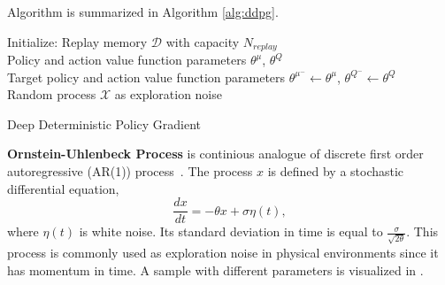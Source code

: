 Algorithm is summarized in Algorithm \ref{alg:ddpg}. 
\begin{algorithm}
	\SetAlgoLined
	\DontPrintSemicolon %
	Initialize: Replay memory $\mathcal{D}$ with capacity $N_{replay}$ \\
	Policy and action value function parameters $\theta^{\mu}$, $\theta^Q$ \\
	Target policy and action value function parameters $\theta^{\mu^-} \leftarrow \theta^{\mu}$, $\theta^{Q^-} \leftarrow \theta^{Q}$ \\
	Random process $\mathcal{X}$ as exploration noise\\
	\caption{Deep Deterministic Policy Gradient}
	\label{alg:ddpg}
\end{algorithm}

\textbf{Ornstein-Uhlenbeck Process} is continious analogue of discrete first order autoregressive (AR(1)) process~\cite{uhlenbeck_theory_1930}. 
The process $x$ is defined by a stochastic differential equation,
\begin{equation}
\label{eqn:ou_process}
\frac{dx}{dt} = -\theta x + \sigma \eta(t),
\end{equation}
where $\eta(t)$ is white noise. 
Its standard deviation in time is equal to $\frac{\sigma}{\sqrt{2\theta}}$. 
This process is commonly used as exploration noise in physical environments since it has momentum in time. 
A sample with different parameters is visualized in .

